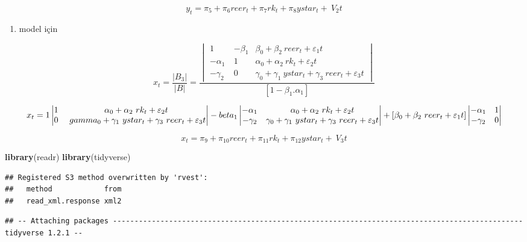 \documentclass[]{article}
\newenvironment{Shaded}{\begin{snugshade}}{\end{snugshade}}
\newcommand{\KeywordTok}[1]{\textcolor[rgb]{0.13,0.29,0.53}{\textbf{#1}}}
\newcommand{\NormalTok}[1]{#1}
\providecommand{\tightlist}{%
  \setlength{\itemsep}{0pt}\setlength{\parskip}{0pt}}
\begin{document}
\[
y_t= \pi_5 + \pi_6 reer_t + \pi_7 rk_t + \pi_8 ystar_t + \ V_2t
\]

\begin{enumerate}
\def\labelenumi{\arabic{enumi}.}
\setcounter{enumi}{2}
\tightlist
\item
  model için
\end{enumerate}

\[
x_t = \frac{|B_3|}{|B|} = \frac{{\begin{vmatrix} 1 & -\beta_1 & \beta_0 + \beta_2\ reer_t + \varepsilon_1t \\
-\alpha_1\ & 1 &  \alpha_0 + \alpha_2\ rk_t + \varepsilon_2t\\
-\gamma_2\ & 0 & \gamma_0 + \gamma_1\ ystar_t + \gamma_3\ reer_t + \varepsilon_3t
\end{vmatrix}}}{[{1 - \beta_1 . \alpha_1}]}
\]

\[
 x_t = 1 \begin{vmatrix} 1 & \alpha_0 + \alpha_2\ rk_t + \varepsilon_2t \\ 0 & \ gamma_0 + \gamma_1\ ystar_t + \gamma_3\ reer_t + \varepsilon_3t \end{vmatrix} - \\beta_1 \begin{vmatrix} -\alpha_1 & \alpha_0 + \alpha_2\ rk_t + \varepsilon_2t \\ -\gamma_2 & \gamma_0 + \gamma_1\ ystar_t + \gamma_3\ reer_t + \varepsilon_3t \end{vmatrix} + [\beta_0 + \beta_2\ reer_t + \varepsilon_1t] \begin{vmatrix} -\alpha_1 & 1 \\ -\gamma_2 & 0 \end{vmatrix}
\]

\[
 x_t= \pi_9 + \pi_10 reer_t + \pi_11 rk_t + \pi_12 ystar_t + \ V_3t
\]

\begin{Shaded}
\begin{Highlighting}[]
\KeywordTok{library}\NormalTok{(readr)}
\KeywordTok{library}\NormalTok{(tidyverse)}
\end{Highlighting}
\end{Shaded}

\begin{verbatim}
## Registered S3 method overwritten by 'rvest':
##   method            from
##   read_xml.response xml2
\end{verbatim}

\begin{verbatim}
## -- Attaching packages ----------------------------------------------------------------------------------------------- tidyverse 1.2.1 --
\end{verbatim}
\end{document}
